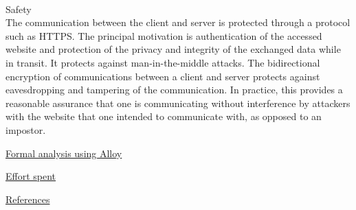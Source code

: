 \documentclass{article}
\begin{document}
\begin{legal}
\begin{legal}
\begin{legal}
			\\
			\item Safety\\
			{\normalfont The communication between the client and server is protected through a protocol such as HTTPS. The principal motivation is authentication of the accessed website and protection of the privacy and integrity of the exchanged data while in transit. It protects against man-in-the-middle attacks. The bidirectional encryption of communications between a client and server protects against eavesdropping and tampering of the communication. In practice, this provides a reasonable assurance that one is communicating without interference by attackers with the website that one intended to communicate with, as opposed to an impostor. }
			\\
		\end{legal}
		\end{legal}
	\item \underline{Formal analysis using Alloy}\\
	\item \underline{Effort spent}\\
	\item \underline{References}\\
	\end{legal}
\end{document}
